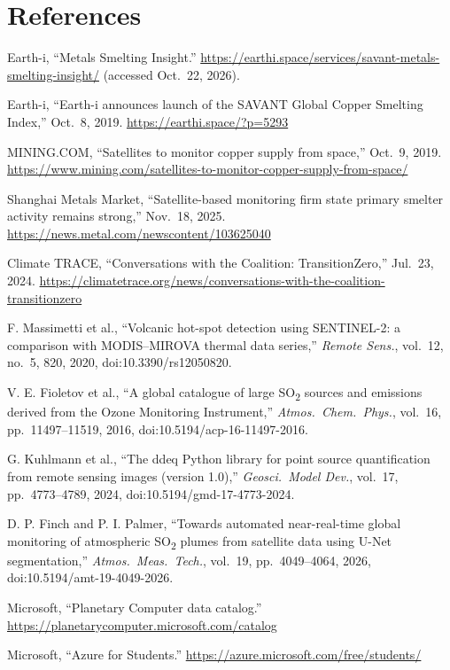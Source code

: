 \documentclass[10pt,a4paper]{article}
\newcommand{\SOtwo}{SO\textsubscript{2}}
\begin{document}
\section*{References}
\small
\begin{enumerate}[label={[\arabic*]},leftmargin=2.2em,itemsep=1pt]
\item Earth-i, ``Metals Smelting Insight.'' \url{https://earthi.space/services/savant-metals-smelting-insight/} (accessed Oct.\ 22, 2026).
\item Earth-i, ``Earth-i announces launch of the SAVANT Global Copper Smelting Index,'' Oct.\ 8, 2019. \url{https://earthi.space/?p=5293}
\item MINING.COM, ``Satellites to monitor copper supply from space,'' Oct.\ 9, 2019. \url{https://www.mining.com/satellites-to-monitor-copper-supply-from-space/}
\item Shanghai Metals Market, ``Satellite-based monitoring firm state primary smelter activity remains strong,'' Nov.\ 18, 2025. \url{https://news.metal.com/newscontent/103625040}
\item Climate TRACE, ``Conversations with the Coalition: TransitionZero,'' Jul.\ 23, 2024. \url{https://climatetrace.org/news/conversations-with-the-coalition-transitionzero}
\item F. Massimetti et al., ``Volcanic hot-spot detection using SENTINEL-2: a comparison with MODIS--MIROVA thermal data series,'' \emph{Remote Sens.}, vol.\ 12, no.\ 5, 820, 2020, doi:10.3390/rs12050820.
\item V. E. Fioletov et al., ``A global catalogue of large \SOtwo{} sources and emissions derived from the Ozone Monitoring Instrument,'' \emph{Atmos.\ Chem.\ Phys.}, vol.\ 16, pp.\ 11497--11519, 2016, doi:10.5194/acp-16-11497-2016.
\item G. Kuhlmann et al., ``The ddeq Python library for point source quantification from remote sensing images (version 1.0),'' \emph{Geosci.\ Model Dev.}, vol.\ 17, pp.\ 4773--4789, 2024, doi:10.5194/gmd-17-4773-2024.
\item D. P. Finch and P. I. Palmer, ``Towards automated near-real-time global monitoring of atmospheric \SOtwo{} plumes from satellite data using U-Net segmentation,'' \emph{Atmos.\ Meas.\ Tech.}, vol.\ 19, pp.\ 4049--4064, 2026, doi:10.5194/amt-19-4049-2026.
\item Microsoft, ``Planetary Computer data catalog.'' \url{https://planetarycomputer.microsoft.com/catalog}
\item Microsoft, ``Azure for Students.'' \url{https://azure.microsoft.com/free/students/}

\end{enumerate}
\end{document}
